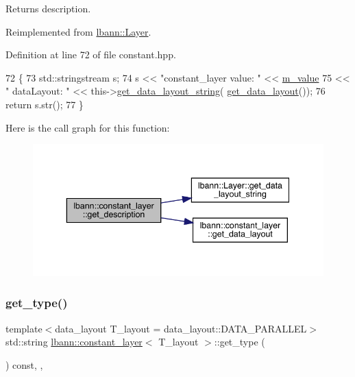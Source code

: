 Returns description. 

Reimplemented from \hyperlink{classlbann_1_1Layer_acc0803d3428914ca1eb5988c4309174a}{lbann\+::\+Layer}.



Definition at line 72 of file constant.\+hpp.


\begin{DoxyCode}
72                                              \{
73     std::stringstream s;
74      s << \textcolor{stringliteral}{"constant\_layer  value: "} << \hyperlink{classlbann_1_1constant__layer_a8cdb9c854777cc29f1cf1f60da64ef4e}{m\_value}
75        << \textcolor{stringliteral}{" dataLayout: "} << this->\hyperlink{classlbann_1_1Layer_ae3f4a5602df821f4221614b1e3782dc1}{get\_data\_layout\_string}(
      \hyperlink{classlbann_1_1constant__layer_ac69dbc39164ddb6cee7f61434bdb317d}{get\_data\_layout}());
76      \textcolor{keywordflow}{return} s.str();
77   \}
\end{DoxyCode}
Here is the call graph for this function\+:\nopagebreak
\begin{figure}[H]
\begin{center}
\leavevmode
\includegraphics[width=343pt]{classlbann_1_1constant__layer_a2745baa79137db746795634144b99080_cgraph}
\end{center}
\end{figure}
\mbox{\label{classlbann_1_1constant__layer_ae4fb6731f212f6889e31f0c6b7ba9712}} 
\subsubsection{\texorpdfstring{get\+\_\+type()}{get\_type()}}
{\footnotesize\ttfamily template$<$data\+\_\+layout T\+\_\+layout = data\+\_\+layout\+::\+D\+A\+T\+A\+\_\+\+P\+A\+R\+A\+L\+L\+EL$>$ \\
std\+::string \hyperlink{classlbann_1_1constant__layer}{lbann\+::constant\+\_\+layer}$<$ T\+\_\+layout $>$\+::get\+\_\+type (\begin{DoxyParamCaption}{ }\end{DoxyParamCaption}) const\hspace{0.3cm}{\ttfamily [inline]}, {\ttfamily [override]}, {\ttfamily [virtual]}}

